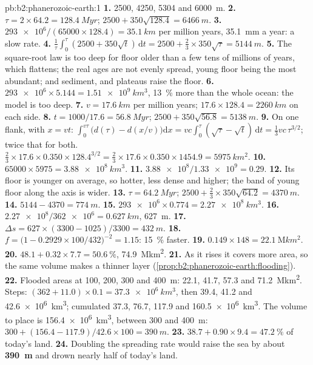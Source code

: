 \begin{solution}{pb:b2:phanerozoic-earth:1}
\textbf{1.} 2500, 4250, 5304 and \qty{6000}{m}.
\textbf{2.} $\tau = 2 \times 64.2 = \qty{128.4}{Myr}$; $2500 + 350\sqrt{128.4} = \qty{6466}{m}$.
\textbf{3.} $\num{293e6}/(65000 \times 128.4) = \qty{35.1}{km}$ per million years,
\qty{35.1}{mm} a year: a slow rate.
\textbf{4.} $\frac1\tau\int_0^\tau(2500 + 350\sqrt t)\,\mathrm{d}t = 2500 + \frac23 \times
350\sqrt\tau = \qty{5144}{m}$.
\textbf{5.} The square-root law is too deep for floor older than a few tens of millions of years,
which flattens; the real ages are not evenly spread, young floor being the most abundant; and
sediment,  and plateaus raise the floor.
\textbf{6.} $\num{293e6} \times 5.144 = \qty{1.51e9}{km^3}$, \qty{13}{\percent} more than the
whole ocean: the model is too deep.
\textbf{7.} $v = \qty{17.6}{km}$ per million years; $17.6 \times 128.4 = \qty{2260}{km}$ on
each side.
\textbf{8.} $t = 1000/17.6 = \qty{56.8}{Myr}$; $2500 + 350\sqrt{56.8} = \qty{5138}{m}$.
\textbf{9.} On one flank, with $x = vt$: $\int_0^{v\tau}\bigl(d(\tau) - d(x/v)\bigr)\mathrm{d}x
= vc\int_0^\tau(\sqrt\tau - \sqrt t)\,\mathrm{d}t = \frac13 vc\,\tau^{3/2}$; twice that for both.
$\frac23 \times 17.6 \times 0.350 \times 128.4^{3/2} = \frac23 \times 17.6 \times 0.350 \times
1454.9 = \qty{5975}{km^2}$.
\textbf{10.} $65000 \times 5975 = \qty{3.88e8}{km^3}$.
\textbf{11.} $\num{3.88e8}/\num{1.33e9} = 0.29$.
\textbf{12.} Its floor is younger on average, so hotter, less dense and higher; the band of young
floor along the axis is wider.
\textbf{13.} $\tau = \qty{64.2}{Myr}$; $2500 + \frac23 \times 350\sqrt{64.2} = \qty{4370}{m}$.
\textbf{14.} $5144 - 4370 = \qty{774}{m}$.
\textbf{15.} $\num{293e6} \times 0.774 = \qty{2.27e8}{km^3}$.
\textbf{16.} $\num{2.27e8}/\num{362e6} = \qty{0.627}{km}$, \qty{627}{m}.
\textbf{17.} $\Delta s = 627 \times (3300 - 1025)/3300 = \qty{432}{m}$.
\textbf{18.} $f = \bigl(1 - 0.2929 \times 100/432\bigr)^{-2} = 1.15$: \qty{15}{\percent} faster.
\textbf{19.} $0.149 \times 148 = \qty{22.1}{\mega km^2}$.
\textbf{20.} $48.1 + 0.32 \times 7.7 = \qty{50.6}{\percent}$, \qty{74.9}{\mega km^2}.
\textbf{21.} As it rises it covers more area, so the same volume makes a thinner layer
(\cref{prop:b2:phanerozoic-earth:flooding}).
\textbf{22.} Flooded areas at 100, 200, 300 and \qty{400}{m}: 22.1, 41.7, 57.3 and
\qty{71.2}{\mega km^2}. Steps: $(362 + 11.0) \times 0.1 = \qty{37.3e6}{km^3}$, then 39.4, 41.2
and \qty{42.6e6}{km^3}; cumulated 37.3, 76.7, 117.9 and \qty{160.5e6}{km^3}. The volume to place
is \qty{156.4e6}{km^3}, between 300 and \qty{400}{m}: $300 + (156.4 - 117.9)/42.6 \times 100
= \qty{390}{m}$.
\textbf{23.} $38.7 + 0.90 \times 9.4 = \qty{47.2}{\percent}$ of today's land.
\textbf{24.} Doubling the spreading rate would raise the sea by about \textbf{\qty{390}{m}} and
drown nearly half of today's land.
\end{solution}
